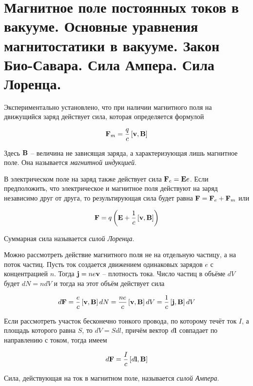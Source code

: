 \section{Магнитное поле постоянных токов в вакууме. Основные уравнения магнитостатики в вакууме. Закон Био-Савара. Сила Ампера. Сила Лоренца.}

Экспериментально установлено, что при наличии магнитного поля на движущийся заряд действует сила, которая определяется формулой

\begin{equation}
    \mathbf F_m = \frac{q}{c} \left[ \mathbf v, \mathbf B \right]
\end{equation}

Здесь $\mathbf B$ -- величина не зависящая заряда, а характеризующая лишь магнитное поле. Она называется \textit{магнитной индукцией}.

В электрическом поле на заряд также действует сила $\mathbf F_e = \mathbf E e$. Если предположить, что электрическое и магнитное поля действуют на заряд независимо друг от друга, то результирующая сила будет равна $\mathbf F = \mathbf F_e + \mathbf F_m$ или

\begin{equation}
    \mathbf F = q \left( \mathbf E + \frac{1}{c} \left[ \mathbf v, \mathbf B \right] \right)
\end{equation}

\noindent
Суммарная сила называется \textit{силой Лоренца}.

Можно рассмотреть действие магнитного поля не на отдельную частицу, а на поток частиц. Пусть ток создается движением одинаковых зарядов $e$ с концентрацией $n$. Тогда $\mathbf j = n e \mathbf v$ -- плотность тока. Число частиц в объёме $dV$ будет $dN = n dV$ и тогда на этот объём действует сила

\begin{equation*}
    d \mathbf F = \frac{e}{c} \left[ \mathbf v, \mathbf B \right] dN = \frac{n e}{c} \left[ \mathbf v, \mathbf B \right] dV = \frac{1}{c} \left[ \mathbf j, \mathbf B \right] dV
\end{equation*}

\noindent
Если рассмотреть участок бесконечно тонкого провода, по которому течёт ток $I$, а площадь которого равна $S$, то $dV = S dl$, причём вектор $d \mathbf l$ совпадает по направлению с током, тогда имеем

\begin{equation}
    d \mathbf F = \frac{I}{c} \left[ d \mathbf l, \mathbf B \right]
\end{equation}

\noindent
Сила, действующая на ток в магнитном поле, называется \textit{силой Ампера}.

